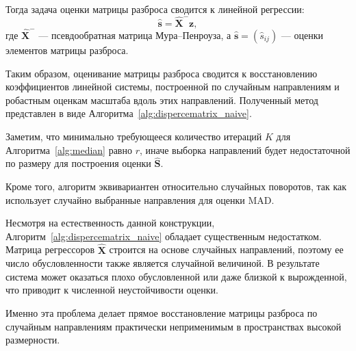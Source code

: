 Тогда задача оценки матрицы разброса сводится к линейной регрессии:
\begin{equation*}
\widehat{\mathbf{s}} = \hat{\mathbf{X}}^{-}\mathbf{z},
\end{equation*}
где $\hat{\mathbf{X}}^{-}$ --- псевдообратная матрица Мура--Пенроуза, а $\widehat{\mathbf{s}}=(\widehat{s}_{ij})$ --- оценки элементов матрицы разброса.

Таким образом, оценивание матрицы разброса сводится к восстановлению коэффициентов линейной системы, построенной по случайным направлениям и робастным оценкам масштаба вдоль этих направлений. Полученный метод представлен в виде Алгоритма~\ref{alg:dispercematrix_naive}.

Заметим, что минимально требующееся количество итераций $K$ для Алгоритма~\ref{alg:median} равно $r$, иначе выборка направлений будет недостаточной по размеру для построения оценки $\widehat{\mathbf{S}}$.

Кроме того, алгоритм эквивариантен относительно случайных поворотов, так как использует случайно выбранные направления для оценки MAD.


Несмотря на естественность данной конструкции, Алгоритм~\ref{alg:dispercematrix_naive} обладает существенным недостатком. Матрица регрессоров $\hat{\mathbf{X}}$ строится на основе случайных направлений, поэтому ее число обусловленности также является случайной величиной. В результате система может оказаться плохо обусловленной или даже близкой к вырожденной, что приводит к численной неустойчивости оценки.

Именно эта проблема делает прямое восстановление матрицы разброса по случайным направлениям практически неприменимым в пространствах высокой  размерности.


